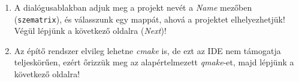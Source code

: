 \begin{frame}
  \begin{enumerate}
    \setcounter{enumi}{\theqt}
    \item A dialógusablakban adjuk meg a projekt nevét a \emph{Name} mezőben (\texttt{szematrix}), és válasszunk egy mappát, ahová a projektet elhelyezhetjük! Végül lépjünk a következő oldalra (\emph{Next})!\\
    \item Az építő rendszer elvileg lehetne \emph{cmake} is, de ezt az IDE nem támogatja teljeskörűen, ezért őrizzük meg az alapértelmezett \emph{qmake}-et, majd lépjünk a következő oldalra!\\
    \setcounter{qt}{\theenumi}
  \end{enumerate}
\end{frame}

